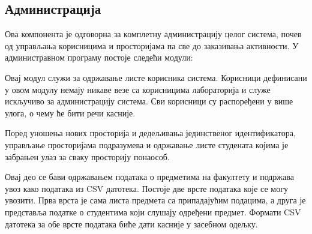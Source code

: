 \documentclass[a4paper, 12pt, diplomski]{etfcyr}
\makeatletter
\newcommand{\indentfirstparagraphoff}{
	\renewenvironment{justify}{%
		\trivlist
		\justifying
		\item\relax
	}{
		\endtrivlist
	}
}
\gdef\tshortstack{\@ifnextchar[\@tshortstack{\@tshortstack[c]}}
\let\@tshortstack\@shortstack
\makeatother
\begin{document}
			\subsection{Администрација}
				\begin{justify}
					Ова компонента је одговорна за комплетну администрацију целог система, почев од управљања корисницима и просторијама па све до заказивања активности. У администравном програму постоје следећи модули:

					\begin{labeling}{\smash{\tshortstack[l]{Управљање\\активностима}}}
						\indentfirstparagraphoff

						\item[\smash{\tshortstack[l]{Управљање\\системским\\корисницима}}]
							\begin{justify}
								Овај модул служи за одржавање листе корисника система. Корисници дефинисани у овом модулу немају никаве везе са корисницима лабораторија и служе искључиво за администрацију система. Сви корисници су распоређени у више улога, о чему ће бити речи касније.
							\end{justify}

						\item[\smash{\tshortstack[l]{Управљање\\просторијама}}]
							\begin{justify}
								Поред уношења нових просторија и дедељивања јединственог идентификатора, управљање просторијама подразумева и одржавање листе студената којима је забрањен улаз за сваку просторију понаособ.
							\end{justify}

						\item[\smash{\tshortstack[l]{Управљање\\предметима}}]
							\begin{justify}
								Овај део се бави одржавањем података о предметима на факултету и подржава увоз како података из CSV датотека. Постоје две врсте података које се могу увозити. Прва врста је сама листа предмета са припадајућим подацима, а друга је представља податке о студентима који слушају одређени предмет. Формати CSV датотека за обе врсте података биће дати касније у засебном одељку.
							\end{justify}


\end{labeling}
\end{justify}
\end{document}
